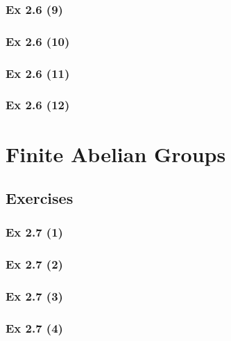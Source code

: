 \subsubsection{Ex 2.6 (9)}\label{sec:Ex_2.6.9}

\subsubsection{Ex 2.6 (10)}\label{sec:Ex_2.6.10}

\newpage		%

\subsubsection{Ex 2.6 (11)}\label{sec:Ex_2.6.11}

\subsubsection{Ex 2.6 (12)}\label{sec:Ex_2.6.12}

\newpage		%

\section{Finite Abelian Groups}\label{sec:2.7}
\subsection{Exercises}\label{sec:2.7_Exercises}

\subsubsection{Ex 2.7 (1)}\label{sec:Ex_2.7.1}

\subsubsection{Ex 2.7 (2)}\label{sec:Ex_2.7.2}

\subsubsection{Ex 2.7 (3)}\label{sec:Ex_2.7.3}

\subsubsection{Ex 2.7 (4)}\label{sec:Ex_2.7.4}

